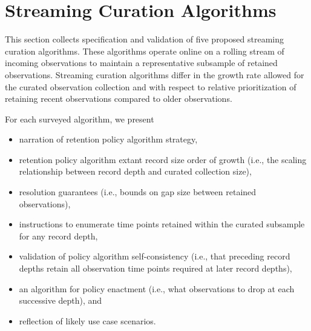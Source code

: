 \section{Streaming Curation Algorithms} \label{sec:annotation-algorithms}



This section collects specification and validation of five proposed streaming curation algorithms.
These algorithms operate online on a rolling stream of incoming observations to maintain a representative subsample of retained observations.
Streaming curation algorithms differ in the growth rate allowed for the curated observation collection and with respect to relative prioritization of retaining recent observations compared to older observations.

For each surveyed algorithm, we present
\begin{itemize}
\item narration of retention policy algorithm strategy,
\item retention policy algorithm extant record size order of growth (i.e., the scaling relationship between record depth and curated collection size),
\item resolution guarantees (i.e., bounds on gap size between retained observations),
\item instructions to enumerate time points retained within the curated subsample for any record depth,
\item validation of policy algorithm self-consistency (i.e., that preceding record depths retain all observation time points required at later record depths),
\item an algorithm for policy enactment (i.e., what observations to drop at each successive depth), and
\item reflection of likely use case scenarios.
\end{itemize}

